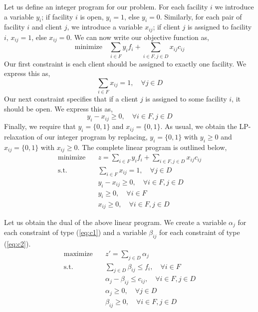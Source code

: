 \documentclass[10pt]{article}
\numberwithin{equation}{section}
\begin{document}
Let us define an integer program for our problem. For each facility $i$ we introduce a variable $y_i$; if facility $i$ is open, $y_i = 1$, else $y_i = 0$. Similarly, for each pair of facility $i$ and client $j$, we introduce a variable $x_{ij}$; if client $j$ is assigned to facility $i$, $x_{ij} = 1$, else $x_{ij} = 0$. We can now write our objective function as,
\begin{equation*}
\text{minimize} \quad \sum_{i \in F}y_if_i + \sum_{i \in F, j \in D}x_{ij}c_{ij}
\end{equation*}
Our first constraint is each client should be assigned to exactly one facility. We express this as,
\begin{equation*}
\sum_{i \in F}x_{ij} = 1, \quad \forall j \in D
\end{equation*}
Our next constraint specifies that if a client $j$ is assigned to some facility $i$, it should be open. We express this as,
\begin{equation*}
y_i - x_{ij} \geq 0, \quad \forall i \in F, j \in D
\end{equation*}
Finally, we require that $y_i = \{0, 1\}$ and $x_{ij} = \{0, 1\}$. As usual, we obtain the LP-relaxation of our integer program by replacing, $y_i = \{0, 1\}$ with $y_i \geq 0$ and $x_{ij} = \{0, 1\}$ with $x_{ij} \geq 0$. The complete linear program is outlined below,
\begin{align}\label{eq:uncapacitated-facility-lp}
\text{minimize} \quad    & z = \sum_{i \in F}y_if_i + \sum_{i \in F, j \in D}x_{ij}c_{ij} \\
\text{s.t.}     \quad    & \sum_{i \in F}x_{ij} = 1, \quad \forall j \in D \label{eq:c1} \\
                         & y_i - x_{ij} \geq 0, \quad \forall i \in F, j \in D \label{eq:c2} \\
                         & y_i \geq 0, \quad \forall i \in F \nonumber \\
                         & x_{ij} \geq 0, \quad \forall i \in F, j \in D \nonumber 
\end{align}

Let us obtain the dual of the above linear program. We create a variable $\alpha_j$ for each constraint of type (\ref{eq:c1}) and a variable $\beta_{ij}$ for each constraint of type (\ref{eq:c2}).
\begin{align}\label{eq:uncapacitated-facility-lp-dual}
\text{maximize} \quad    & z' = \sum_{j \in D}\alpha_j \\
\text{s.t.}     \quad    & \sum_{j \in D}\beta_{ij} \leq f_i, \quad \forall i \in F \label{eq:c1-dual} \\
                         & \alpha_j - \beta_{ij} \leq c_{ij}, \quad \forall i \in F, j \in D \label{eq:c2-dual} \\
                         & \alpha_j \geq 0, \quad \forall j \in D \nonumber \\
                         & \beta_{ij} \geq 0, \quad \forall i \in F, j \in D \nonumber 
\end{align}
\end{document}
